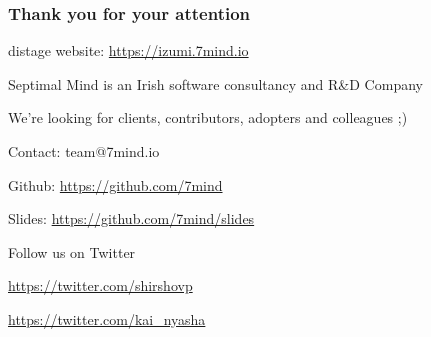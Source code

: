 \documentclass[usenames,dvipsnames]{beamer}
\begin{document}
\begin{frame}
    \frametitle{Thank you for your attention}
    \begin{center}
      distage website: \url{https://izumi.7mind.io}
    \end{center}
    \begin{center}
      \color{RubineRed}
      Septimal Mind is an Irish software consultancy and R\&D Company

      \vspace{0.3cm}
      We're looking for clients, contributors, adopters and colleagues ;)
    \end{center}
    \begin{center}
      Contact: team@7mind.io

      \vspace{0.3cm}
      Github: \url{https://github.com/7mind}

      \vspace{0.3cm}
      Slides: \url{https://github.com/7mind/slides}
    \end{center}
    \begin{center}
      \color{RoyalBlue}
      Follow us on Twitter

      \vspace{0.3cm}
      \url{https://twitter.com/shirshovp}

      \vspace{0.3cm}
      \url{https://twitter.com/kai_nyasha}
    \end{center}
\end{frame}
\end{document}
